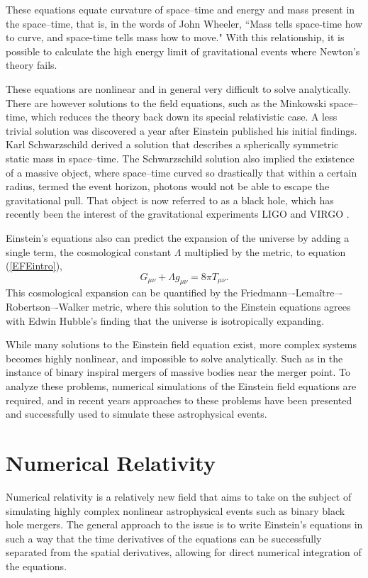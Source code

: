 \documentclass[11pt]{article}
\numberwithin{equation}{section}
\begin{document}
These equations equate curvature of space--time and energy and mass present in the space--time, that is, in the words of John Wheeler, ``Mass tells space-time how to curve, and space-time tells mass how to move." With this relationship, it is possible to calculate the high energy limit of gravitational events where Newton's theory fails. 

These equations are nonlinear and in general very difficult to solve analytically. There are however solutions to the field equations, such as the Minkowski space--time, which reduces the theory back down its special relativistic case. A less trivial solution was discovered a year after Einstein published his initial findings. Karl Schwarzschild derived a solution that describes a spherically symmetric static mass in space--time. The Schwarzschild solution also implied the existence of a massive object, where space--time curved so drastically that within a certain radius, termed the event horizon, photons would not be able to escape the gravitational pull. That object is now referred to as a black hole, which has recently been the interest of the gravitational experiments LIGO \cite{LIGOPAPER1} and VIRGO \cite{2017ApJ...851L..35A}.  

Einstein's equations also can predict the expansion of the universe by adding a single term, the cosmological constant $\Lambda$ multiplied by the metric, to equation (\ref{EFEintro}),
\begin{equation}\label{EFEcosmo}
    G_{\mu\nu} + \Lambda g_{\mu\nu} = 8\pi T_{\mu\nu}.
\end{equation}
This cosmological expansion can be quantified by the Friedmann–-Lemaître–-Robertson–-Walker metric, where this solution to the Einstein equations agrees with Edwin Hubble's finding that the universe is isotropically expanding.

While many solutions to the Einstein field equation exist, more complex systems becomes highly nonlinear, and impossible to solve analytically. Such as in the instance of binary inspiral mergers of massive bodies near the merger point. To analyze these problems, numerical simulations of the Einstein field equations are required, and in recent years approaches to these problems have been presented and successfully used to simulate these astrophysical events.


\section{Numerical Relativity}
Numerical relativity is a relatively new field that aims to take on the subject of simulating highly complex nonlinear astrophysical events such as binary black hole mergers. The general approach to the issue is to write Einstein's equations in such a way that the time derivatives of the equations can be successfully separated from the spatial derivatives, allowing for direct numerical integration of the equations. 
\end{document}
